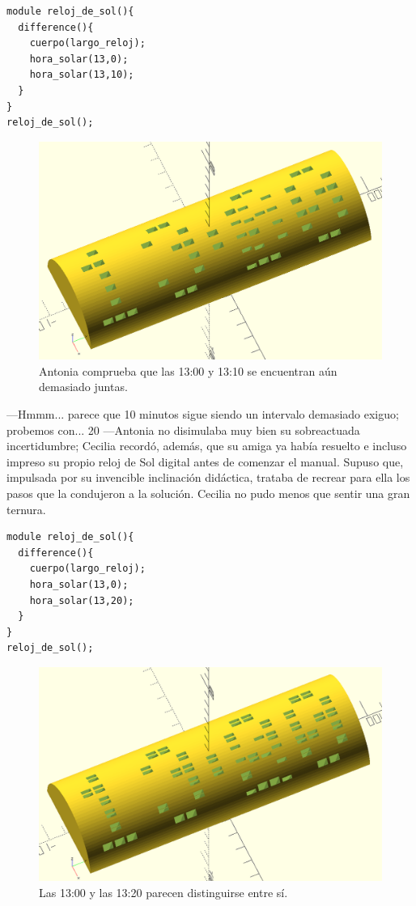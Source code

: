 \begin{lstlisting}
module reloj_de_sol(){
  difference(){
    cuerpo(largo_reloj);
    hora_solar(13,0);
    hora_solar(13,10);
  }
}
reloj_de_sol();
\end{lstlisting}%

\begin{figure}[ht]
  \centering
  \includegraphics[width=.75\textwidth]{imagenes/13_00_10}  
  \caption{Antonia comprueba que las 13:00 y 13:10 se encuentran aún
    demasiado juntas.}
  \label{fig:13_00_10}
\end{figure}

---Hmmm... parece que 10 minutos sigue siendo un intervalo demasiado
exiguo; probemos con... 20 ---Antonia no disimulaba muy bien su
sobreactuada incertidumbre; Cecilia recordó, además, que su amiga ya
había resuelto e incluso impreso su propio reloj de Sol digital antes
de comenzar el manual. Supuso que, impulsada por su invencible
inclinación didáctica, trataba de recrear para ella los pasos que la
condujeron a la solución. Cecilia no pudo menos que sentir una gran
ternura.

\begin{lstlisting}
module reloj_de_sol(){
  difference(){
    cuerpo(largo_reloj);
    hora_solar(13,0);
    hora_solar(13,20);
  }
}
reloj_de_sol();
\end{lstlisting}%

\begin{figure}[ht]
  \centering
  \includegraphics[width=.75\textwidth]{imagenes/13_00_20}  
  \caption{Las 13:00 y las 13:20 parecen distinguirse entre sí.}
  \label{fig:13_00_20}
\end{figure}

